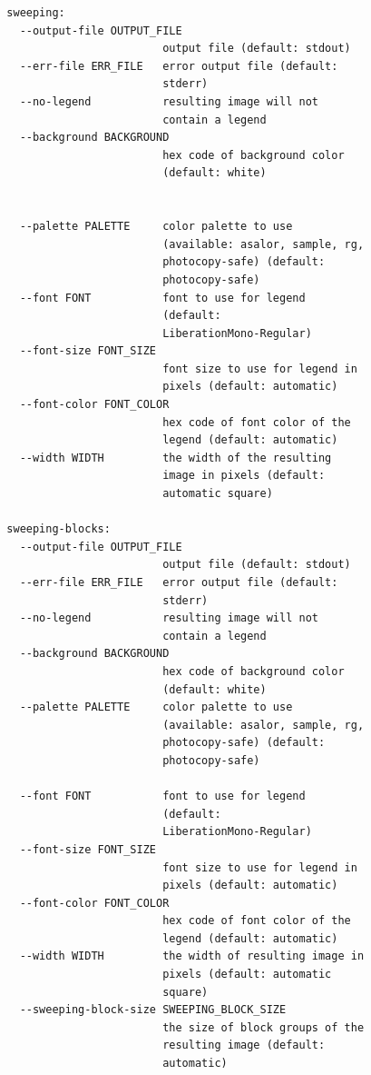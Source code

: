 \documentclass[
  digital, %
  color,   %
  oneside, %
  lof,     %
  nolot,     %
]{fithesis4}
\begin{document}
\begin{verbatim}
  sweeping:
    --output-file OUTPUT_FILE
                          output file (default: stdout)
    --err-file ERR_FILE   error output file (default:
                          stderr)
    --no-legend           resulting image will not
                          contain a legend
    --background BACKGROUND
                          hex code of background color
                          (default: white)
  

    --palette PALETTE     color palette to use
                          (available: asalor, sample, rg,
                          photocopy-safe) (default:
                          photocopy-safe)
    --font FONT           font to use for legend
                          (default: 
                          LiberationMono-Regular)
    --font-size FONT_SIZE
                          font size to use for legend in
                          pixels (default: automatic)
    --font-color FONT_COLOR
                          hex code of font color of the
                          legend (default: automatic)
    --width WIDTH         the width of the resulting
                          image in pixels (default:
                          automatic square)

  sweeping-blocks:
    --output-file OUTPUT_FILE
                          output file (default: stdout)
    --err-file ERR_FILE   error output file (default:
                          stderr)
    --no-legend           resulting image will not
                          contain a legend
    --background BACKGROUND
                          hex code of background color
                          (default: white)
    --palette PALETTE     color palette to use
                          (available: asalor, sample, rg,
                          photocopy-safe) (default:
                          photocopy-safe)

    --font FONT           font to use for legend
                          (default: 
                          LiberationMono-Regular)
    --font-size FONT_SIZE
                          font size to use for legend in
                          pixels (default: automatic)
    --font-color FONT_COLOR
                          hex code of font color of the
                          legend (default: automatic)
    --width WIDTH         the width of resulting image in
                          pixels (default: automatic
                          square)
    --sweeping-block-size SWEEPING_BLOCK_SIZE
                          the size of block groups of the
                          resulting image (default:
                          automatic)


\end{verbatim}
\end{document}
